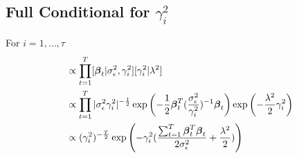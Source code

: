 \documentclass[fleqn]{article}
\def\bm#1{\mbox{\boldmath $#1$}}
\begin{document}
% 
\subsection{Full Conditional for $\gamma^2_i$}
For $i = 1, \ldots, \tau$
\begin{align*}
[\gamma^2_i | \cdot] & \propto \prod_{t = 1}^T [\bm{\beta}_t | \sigma^2_\epsilon, \gamma^2_i] [\gamma^2_i | \lambda^2]\\
 & \propto \prod_{t = 1}^T |\sigma^2_\epsilon \gamma^2_i|^{ - \frac{1} {2}} \exp{ \left( - \frac{1} {2} \bm{\beta}_t^T (\frac{\sigma^2_\epsilon} {\gamma^2_i})^{ - 1} \bm{\beta}_t \right) } \exp{ \left(-\frac{\lambda^2} {2} \gamma^2_i \right) }\\
%
& \propto (\gamma^2_i)^{ - \frac{T} {2}} \exp{ \left( - \gamma^2_i(\frac{\sum_{t = 1}^T \bm{\beta}_t^T \bm{\beta}_t} {2 \sigma^2_\epsilon} + \frac{\lambda^2} {2}) \right) }\\
%
\end{align*}
\end{document}
